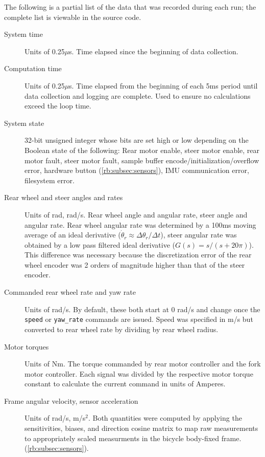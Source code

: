 The following is a partial list of the data that was recorded during each run;
the complete list is viewable in the source code.
\begin{description}
  \item[System time] Units of 0.25$\mu$s. Time elapsed since the beginning of
    data collection.
  \item[Computation time] Units of 0.25$\mu$s. Time elapsed from the
    beginning of each 5ms period until data collection and logging are
    complete. Used to ensure no calculations exceed the loop time.
  \item[System state] 32-bit unsigned integer whose bits are set high or low
    depending on the Boolean state of the following: Rear motor enable, steer
    motor enable, rear motor fault, steer motor fault, sample buffer
    encode/initialization/overflow error, hardware button
    (\autoref{rb:subsec:sensors}), IMU communication error, filesystem error.
  \item[Rear wheel and steer angles and rates] Units of rad, rad/s. Rear wheel
    angle and angular rate, steer angle and angular rate. Rear wheel angular
    rate was determined by a 100ms moving average of an ideal derivative
    ($\dot{\theta}_r \approx \Delta\theta_r / \Delta t$), steer angular rate
    was obtained by a low pass filtered ideal derivative ($G(s)=s/(s+20\pi)$).
    This difference was necessary because the discretization error of the rear
    wheel encoder was 2 orders of magnitude higher than that of the steer
    encoder.
  \item[Commanded rear wheel rate and yaw rate] Units of rad/s. By
    default, these both start at 0 rad/s and change once the \verb|speed| or
    \verb|yaw_rate| commands are issued. Speed was specified in m/s but
    converted to rear wheel rate by dividing by rear wheel radius.
  \item[Motor torques] Units of Nm. The torque commanded by rear motor
    controller and the fork motor controller. Each signal was divided by the
    respective motor torque constant to calculate the current command in units
    of Amperes.
  \item[Frame angular velocity, sensor acceleration] Units of rad/s, m/s$^2$.
    Both quantities were computed by applying the sensitivities, biases, and
    direction cosine matrix to map raw measurements to appropriately scaled
    measurments in the bicycle body-fixed frame.
    (\autoref{rb:subsec:sensors}).
\end{description}


